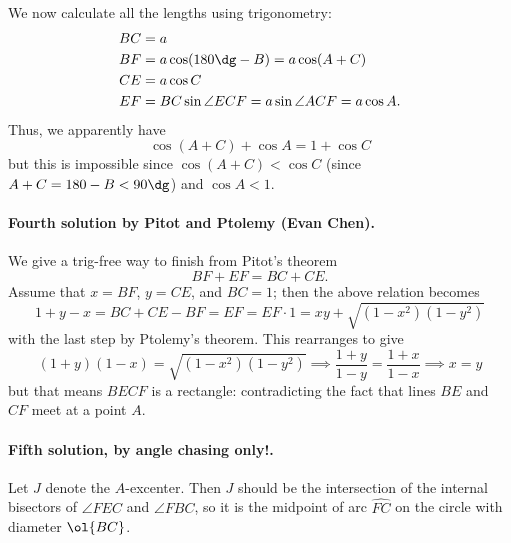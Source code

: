 \documentclass[11pt]{scrartcl}
\begin{document}
We now calculate all the lengths using trigonometry:
\begin{align*}
  BC &= a \\
  BF &= a \cos(180\dg-B) = a \cos (A+C) \\
  CE &= a \cos C \\
  EF &= BC \sin \angle ECF = a \sin \angle ACF = a \cos A.
\end{align*}
Thus, we apparently have
\[ \cos(A+C) + \cos A = 1 + \cos C \]
but this is impossible since $\cos(A+C) < \cos C$
(since $A+C = 180-B < 90\dg$) and $\cos A < 1$.

\paragraph{Fourth solution by Pitot and Ptolemy (Evan Chen).}
We give a trig-free way to finish from Pitot's theorem
\[ BF+EF = BC+CE. \]
Assume that $x = BF$, $y = CE$, and $BC = 1$;
then the above relation becomes
\[ 1 + y - x = BC + CE - BF = EF = EF \cdot 1 = xy + \sqrt{(1-x^2)(1-y^2)} \]
with the last step by Ptolemy's theorem.
This rearranges to give
\[ (1+y)(1-x) = \sqrt{(1-x^2)(1-y^2)}
  \implies \frac{1+y}{1-y} = \frac{1+x}{1-x}
  \implies x = y \]
but that means $BECF$ is a rectangle:
contradicting the fact that lines $BE$ and $CF$ meet at a point $A$.

\paragraph{Fifth solution, by angle chasing only!.}
Let $J$ denote the $A$-excenter.
Then $J$ should be the intersection
of the internal bisectors of $\angle FEC$ and $\angle FBC$,
so it is the midpoint of arc $\widehat{FC}$
on the circle with diameter $\ol{BC}$.
\end{document}
